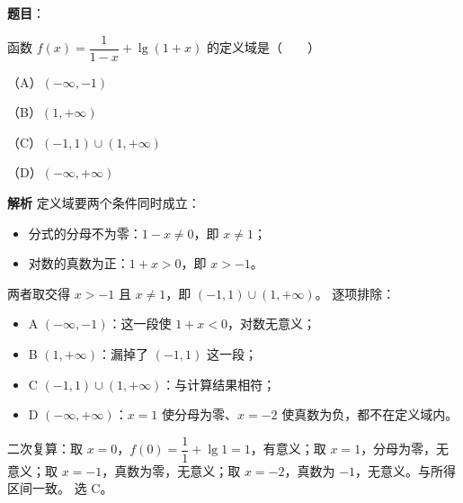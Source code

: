 \begin{answer}

\textbf{题目}：

函数 $f(x)=\dfrac{1}{1-x}+\lg(1+x)$ 的定义域是\mbox{（　　）}

（A）$(-\infty,-1)$

（B）$(1,+\infty)$

（C）$(-1,1)\cup(1,+\infty)$

（D）$(-\infty,+\infty)$

\textbf{解析}
定义域要两个条件同时成立：
\begin{itemize}
\item 分式的分母不为零：$1-x\neq0$，即 $x\neq1$；
\item 对数的真数为正：$1+x>0$，即 $x>-1$。
\end{itemize}

两者取交得 $x>-1$ 且 $x\neq1$，即 $(-1,1)\cup(1,+\infty)$。
逐项排除：
\begin{itemize}
\item A $(-\infty,-1)$：这一段使 $1+x<0$，对数无意义；
\item B $(1,+\infty)$：漏掉了 $(-1,1)$ 这一段；
\item C $(-1,1)\cup(1,+\infty)$：与计算结果相符；
\item D $(-\infty,+\infty)$：$x=1$ 使分母为零、$x=-2$ 使真数为负，都不在定义域内。
\end{itemize}
二次复算：取 $x=0$，$f(0)=\dfrac{1}{1}+\lg1=1$，有意义；取 $x=1$，分母为零，无意义；取 $x=-1$，真数为零，无意义；取 $x=-2$，真数为 $-1$，无意义。与所得区间一致。
选 C。


\end{answer}
